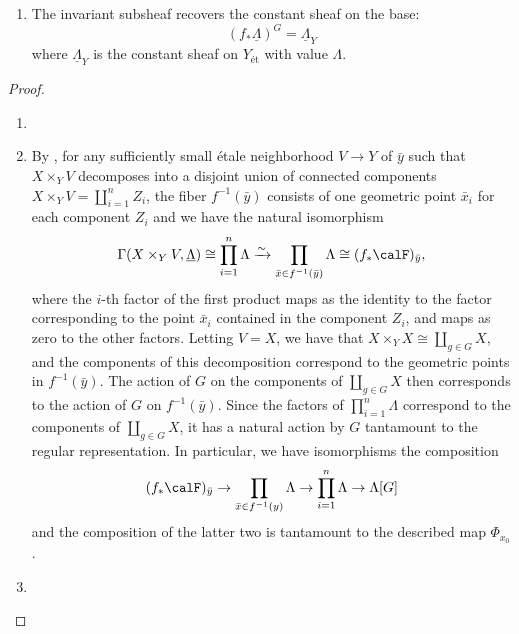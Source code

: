 \begin{proposition}
\begin{enumerate}

    \item The invariant subsheaf recovers the constant sheaf on the base:
    $$ (f_*\underline{\Lambda})^G = \underline{\Lambda}_Y $$
    where $\underline{\Lambda}_Y$ is the constant sheaf on $Y_{\text{ét}}$ with value $\Lambda$.
\end{enumerate}
\end{proposition}

\begin{proof}
    \begin{enumerate}
        \item 
        \item By , for any sufficiently small étale neighborhood $V \to Y$ of $\bar{y}$ such that $X \times_Y V$ decomposes into a disjoint union of connected components $X \times_Y V = \coprod_{i=1}^n Z_i$, the fiber $f^{-1}(\bar{y})$ consists of one geometric point $\bar{x}_i$ for each component $Z_i$ and we have the natural isomorphism
        $$\Gamma(X \times_Y V, \underline{\Lambda}) \cong \prod_{i=1}^n \Lambda \xrightarrow{\sim} \prod_{\bar{x} \in f^{-1}(\bar{y})} \Lambda \cong (f_* \calF)_{\bar{y}},$$
        where the $i$-th factor of the first product maps as the identity to the factor corresponding to the point $\bar{x}_i$ contained in the component $Z_i$, and maps as zero to the other factors. Letting $V = X$, we have that $X \times_Y X \cong \coprod_{g \in G} X$, and the components of this decomposition correspond to the geometric points in $f^{-1}(\bar{y})$. The action of $G$ on the components of $\coprod_{g \in G} X$ then corresponds to the action of $G$ on $f^{-1}(\bar{y})$. Since the factors of $\prod_{i=1}^n \Lambda$ correspond to the components of $\coprod_{g \in G} X$, it has a natural action by $G$ tantamount to the regular representation. In particular, we have isomorphisms the composition
        $$(f_* \calF)_{\bar{y}} \to \prod_{\bar{x} \in f^{-1}(y)} \Lambda \to \prod_{i=1}^n \Lambda \to \Lambda[G]$$
        and the composition of the latter two is tantamount to the described map $\Phi_{x_0}$.

        \item
    \end{enumerate}


\end{proof}
